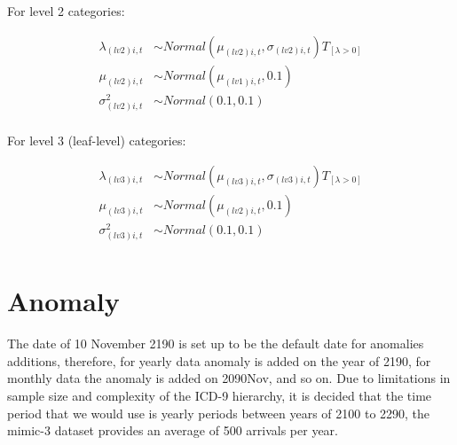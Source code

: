 For level 2 categories:

\begin{equation} \label{hbm8b}
\begin{aligned}
\lambda_{(lv2)i,t} & \sim Normal(\mu_{(lv2)i,t},\sigma_{(lv2)i,t}) T_{[\lambda>0]}\\
\mu_{(lv2)i,t} & \sim Normal(\mu_{(lv1)i,t},0.1)\\
\sigma^2_{(lv2)i,t} &\sim Normal(0.1,0.1)\\
\end{aligned}
\end{equation}

For level 3 (leaf-level) categories:

\begin{equation} \label{hbm8b}
\begin{aligned}
\lambda_{(lv3)i,t} & \sim Normal(\mu_{(lv3)i,t},\sigma_{(lv3)i,t}) T_{[\lambda>0]}\\
\mu_{(lv3)i,t} & \sim Normal(\mu_{(lv2)i,t},0.1)\\
\sigma^2_{(lv3)i,t} &\sim Normal(0.1,0.1)\\
\end{aligned}
\end{equation}


\section{Anomaly} 

The date of 10 November 2190 is set up to be the default date for anomalies additions, therefore, for yearly data anomaly is added on the year of 2190, for monthly data the anomaly is added on 2090Nov, and so on. Due to limitations in sample size and complexity of the ICD-9 hierarchy, it is decided that the time period that we would use is yearly periods between years of 2100 to 2290, the mimic-3 dataset provides an average of 500 arrivals per year.

\newpara

